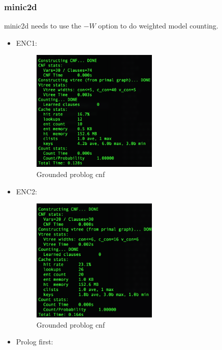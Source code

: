 \documentclass[a4paper,10pt]{report}
\begin{document}
\subsubsection*{minic2d}
minic2d needs to use the $-W$ option to do weighted model counting.
\begin{itemize}
	\item ENC1:
\begin{figure}[H]
  \includegraphics[width=6cm]{minic2d-ENC1.png}
  \caption{Grounded problog cnf}
 
\end{figure}
	\item ENC2:
	\begin{figure}[H]
  \includegraphics[width=6cm]{minic2d-ENC2.png}
  \caption{Grounded problog cnf}
\end{figure}
	\item Prolog first:
\end{itemize}
\end{document}
